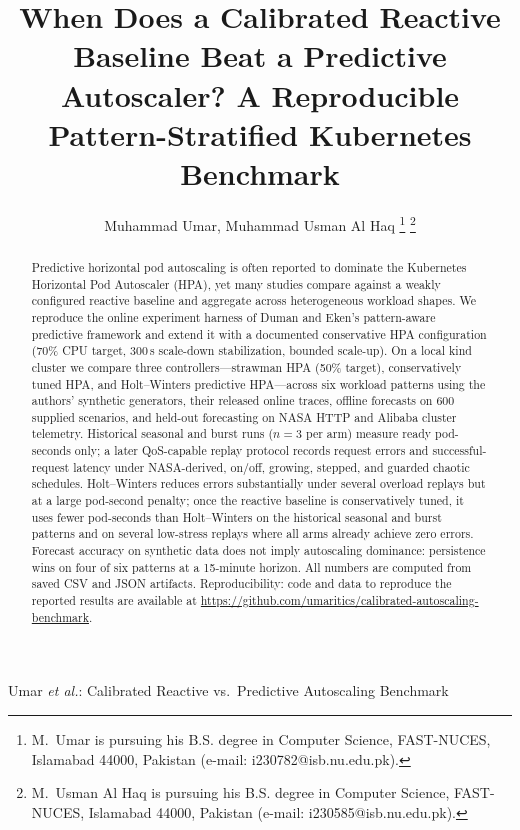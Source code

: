 \documentclass[journal]{IEEEtran}
\begin{document}
\title{When Does a Calibrated Reactive Baseline Beat a Predictive Autoscaler? A Reproducible Pattern-Stratified Kubernetes Benchmark}

\author{Muhammad Umar, Muhammad Usman Al Haq%
\thanks{M.~Umar is pursuing his B.S. degree in Computer Science, FAST-NUCES, Islamabad 44000, Pakistan (e-mail: i230782@isb.nu.edu.pk).}%
\thanks{M.~Usman Al Haq is pursuing his B.S. degree in Computer Science, FAST-NUCES, Islamabad 44000, Pakistan (e-mail: i230585@isb.nu.edu.pk).}%
}

%
{Umar \MakeLowercase{\textit{et al.}}: Calibrated Reactive vs.\ Predictive Autoscaling Benchmark}

\maketitle

\begin{abstract}
Predictive horizontal pod autoscaling is often reported to dominate the Kubernetes Horizontal Pod Autoscaler (HPA), yet many studies compare against a weakly configured reactive baseline and aggregate across heterogeneous workload shapes. We reproduce the online experiment harness of Duman and Eken's pattern-aware predictive framework and extend it with a documented conservative HPA configuration (70\% CPU target, 300\,s scale-down stabilization, bounded scale-up). On a local kind cluster we compare three controllers---strawman HPA (50\% target), conservatively tuned HPA, and Holt--Winters predictive HPA---across six workload patterns using the authors' synthetic generators, their released online traces, offline forecasts on 600 supplied scenarios, and held-out forecasting on NASA HTTP and Alibaba cluster telemetry. Historical seasonal and burst runs ($n{=}3$ per arm) measure ready pod-seconds only; a later QoS-capable replay protocol records request errors and successful-request latency under NASA-derived, on/off, growing, stepped, and guarded chaotic schedules. Holt--Winters reduces errors substantially under several overload replays but at a large pod-second penalty; once the reactive baseline is conservatively tuned, it uses fewer pod-seconds than Holt--Winters on the historical seasonal and burst patterns and on several low-stress replays where all arms already achieve zero errors. Forecast accuracy on synthetic data does not imply autoscaling dominance: persistence wins on four of six patterns at a 15-minute horizon. All numbers are computed from saved CSV and JSON artifacts.
Reproducibility: code and data to reproduce the reported results are available at \url{https://github.com/umaritics/calibrated-autoscaling-benchmark}.
\end{abstract}
\end{document}
